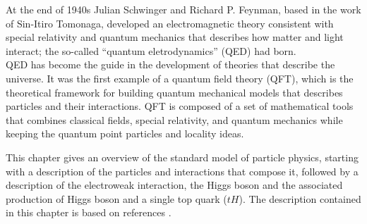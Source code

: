 
\noindent At the end of 1940s Julian Schwinger\cite{schwinger} and Richard P. Feynman\cite{feynman}, based in the work of Sin-Itiro Tomonaga\cite{tomonaga}, developed an electromagnetic theory consistent with special relativity and quantum mechanics that describes how matter and light interact; the so-called ``quantum eletrodynamics'' (QED) had born.\\%

\noindent QED has become the guide in the development of theories that describe the universe. It was the first example of a quantum field theory (QFT), which is the theoretical framework for building quantum mechanical models that describes particles and their interactions. QFT is composed of a set of mathematical tools that combines classical fields, special relativity, and quantum mechanics while keeping the quantum point particles and locality ideas.

\noindent This chapter gives an overview of the standard model of particle physics, starting with a description of the particles and interactions that compose it, followed by a description of the electroweak interaction, the Higgs boson and the associated production of Higgs boson and a single top quark ($tH$). The description contained in this chapter is based on references \cite{griffiths, mandl, halzen}.  %

